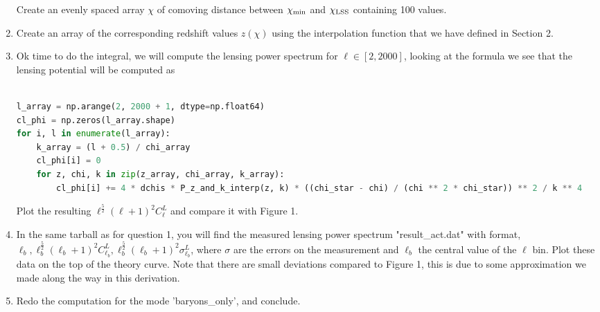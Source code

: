 \documentclass[a4paper, 11pt]{article}
\def\ba{\begin{eqnarray}}
\def\ea{\end{eqnarray}}
\begin{document}
\begin{enumerate}
Create an evenly spaced array $\chi$ of comoving distance between $\chi_{\rm min}$ and $\chi_{\rm LSS}$ containing 100 values.
\item Create an array of the corresponding redshift values $z(\chi)$ using the interpolation function that we have defined in Section 2.
\item Ok time to do the integral, we will compute the lensing power spectrum for $\ell \in [2, 2000]$, looking at the formula we see that the lensing potential will be computed as  \\ \\

 \begin{lstlisting}[language=Python]
l_array = np.arange(2, 2000 + 1, dtype=np.float64)
cl_phi = np.zeros(l_array.shape)
for i, l in enumerate(l_array):
    k_array = (l + 0.5) / chi_array
    cl_phi[i] = 0
    for z, chi, k in zip(z_array, chi_array, k_array):
        cl_phi[i] += 4 * dchis * P_z_and_k_interp(z, k) * ((chi_star - chi) / (chi ** 2 * chi_star)) ** 2 / k ** 4
\end{lstlisting}

Plot the resulting $\ell^\frac{5}{2}(\ell+1)^{2} C_{\ell}^{L}$ and compare it with Figure 1.

\item In the same tarball as for question 1, you will find the measured lensing power spectrum "result\_act.dat" with format, $\ell_{b}, \ell_{b}^\frac{5}{2}(\ell_{b}+1)^{2} C_{\ell_{b}}^{L}, \ell_{b}^\frac{5}{2}(\ell_{b}+1)^{2} \sigma_{\ell_{b}}^{L}$, where $\sigma$ are the errors on the measurement and $\ell_{b}$ the central value of the $\ell$ bin. Plot these data on the top of the theory curve. Note that there are small deviations compared to Figure 1, this is due to some approximation we made along the way in this derivation.
\item Redo the computation for the mode  'baryons\_only', and conclude.





\end{enumerate}

\end{document}

